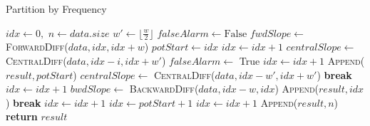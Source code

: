 \begin{algorithm}
\caption{Partition by Frequency}\label{algo:freq}
\begin{algorithmic}[1] 
    \State $idx \gets 0,$ \; $n \gets data.size$ \; $w' \gets \lfloor \frac{w}{2} \rfloor$
     
        \State $falseAlarm \gets \text{False}$
        \State $fwdSlope \gets$ \textsc{ForwardDiff}($data, idx, idx + w$)
         
            \State $potStart \gets idx$
            \State $idx \gets idx + 1$
             
                \State $centralSlope \gets$ \textsc{CentralDiff}($data, idx - i, idx + w'$)
                    \State $falseAlarm \gets$ True 
                \EndIf
                \State $idx \gets idx + 1$
            \EndFor
             
            \State \textsc{Append}($result, potStart$)
             
                \State $centralSlope \gets$ \textsc{CentralDiff}($data, idx - w', idx + w'$)
                    \State\textbf{break} 
                \EndIf
                \State $idx \gets idx + 1$
            \EndWhile
             
                \State $bwdSlope \gets$ \textsc{BackwardDiff}($data, idx - w, idx$)
                    \State \textsc{Append}($result, idx$) 
                    \State\textbf{break} 
                \EndIf
                \State $idx \gets idx + 1$
            \EndWhile
            \Else {}
            \State $idx \gets potStart + 1$ 
            \EndIf
        \Else
            \State $idx \gets idx + 1$ 
        \EndIf
    \EndWhile
    \State \textsc{Append}($result, n$) 
    \State \textbf{return} $result$
    \EndProcedure
\end{algorithmic}
\end{algorithm}

